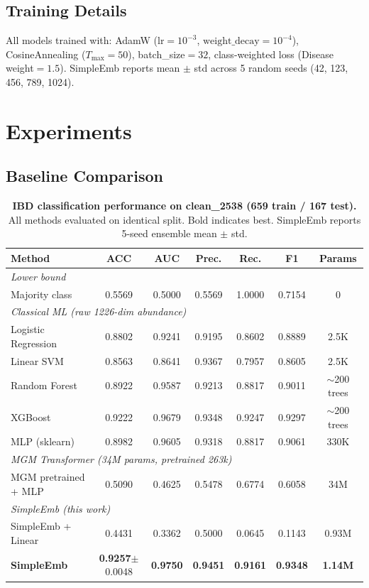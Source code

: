 \documentclass{article} %
\begin{document}
\subsection{Training Details}

All models trained with: AdamW ($\text{lr}{=}10^{-3}$, $\text{weight\_decay}{=}10^{-4}$), CosineAnnealing ($T_{\max}{=}50$), batch\_size${=}32$, class-weighted loss (Disease weight${=}1.5$). SimpleEmb reports mean $\pm$ std across 5 random seeds (42, 123, 456, 789, 1024).

\section{Experiments}

\subsection{Baseline Comparison}
\label{sec:baseline}

\begin{table}[ht]
\centering
\caption{\textbf{IBD classification performance on clean\_2538 (659 train / 167 test).}
All methods evaluated on identical split. Bold indicates best. SimpleEmb reports 5-seed ensemble mean $\pm$ std.}
\label{tab:baselines}
\begin{tabular}{lcccccc}
\toprule
\textbf{Method} & \textbf{ACC} & \textbf{AUC} & \textbf{Prec.} & \textbf{Rec.} & \textbf{F1} & \textbf{Params} \\
\midrule
\multicolumn{7}{l}{\textit{Lower bound}} \\
\;\; Majority class & 0.5569 & 0.5000 & 0.5569 & 1.0000 & 0.7154 & 0 \\
\midrule
\multicolumn{7}{l}{\textit{Classical ML (raw 1226-dim abundance)}} \\
\;\; Logistic Regression & 0.8802 & 0.9241 & 0.9195 & 0.8602 & 0.8889 & 2.5K \\
\;\; Linear SVM & 0.8563 & 0.8641 & 0.9367 & 0.7957 & 0.8605 & 2.5K \\
\;\; Random Forest & 0.8922 & 0.9587 & 0.9213 & 0.8817 & 0.9011 & $\sim$200 trees \\
\;\; XGBoost & 0.9222 & 0.9679 & 0.9348 & 0.9247 & 0.9297 & $\sim$200 trees \\
\;\; MLP (sklearn) & 0.8982 & 0.9605 & 0.9318 & 0.8817 & 0.9061 & 330K \\
\midrule
\multicolumn{7}{l}{\textit{MGM Transformer (34M params, pretrained 263k)}} \\
\;\; MGM pretrained + MLP & 0.5090 & 0.4625 & 0.5478 & 0.6774 & 0.6058 & 34M \\
\midrule
\multicolumn{7}{l}{\textit{SimpleEmb (this work)}} \\
\;\; SimpleEmb + Linear & 0.4431 & 0.3362 & 0.5000 & 0.0645 & 0.1143 & 0.93M \\
\;\; \textbf{SimpleEmb} & \textbf{0.9257}$\pm$0.0048 & \textbf{0.9750} & \textbf{0.9451} & \textbf{0.9161} & \textbf{0.9348} & \textbf{1.14M} \\
\bottomrule
\end{tabular}
\end{table}
\end{document}
